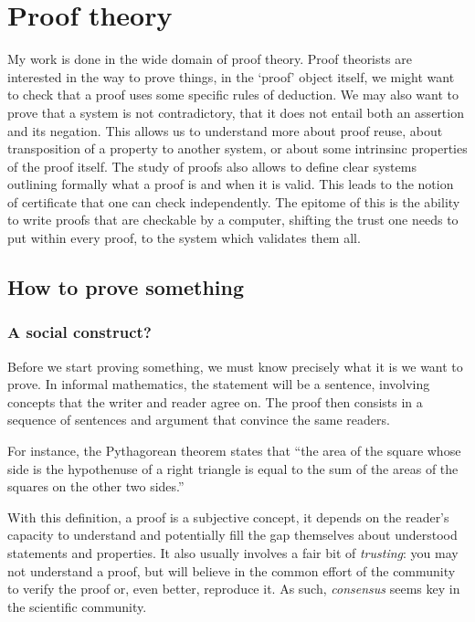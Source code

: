 \chapter{Proof theory}

My work is done in the wide domain of proof theory. Proof theorists are
interested in the way to prove things, in the `proof' object itself, \eg we
might want to check that a proof uses some specific rules of deduction.
We may also want to prove that a system is not contradictory, \ie that it does
not entail both an assertion and its negation.
This allows us to understand more about proof reuse, about transposition of a
property to another system, or about some intrinsinc properties of the proof
itself. The study of proofs also allows to define clear systems outlining
formally what a proof is and when it is valid. This leads to the notion of
certificate that one can check independently. The epitome of this is the ability
to write proofs that are checkable by a computer, shifting the trust one needs
to put within every proof, to the system which validates them all.

\section{How to prove something}

\subsection{A social construct?}

Before we start proving something, we must know precisely what it is we want to
prove. In informal mathematics, the statement will be a sentence, involving
concepts that the writer and reader agree on. The proof then consists in a
sequence of sentences and argument that convince the same readers.

For instance, the Pythagorean theorem states that
``the area of the square whose side is the hypothenuse of a right triangle is
equal to the sum of the areas of the squares on the other two sides.''

With this definition, a proof is a subjective concept, it depends on the
reader's capacity to understand and potentially fill the gap themselves about
understood statements and properties. It also usually involves a fair bit of
\emph{trusting}: you may not understand a proof, but will believe in
the common effort of the community to verify the proof or, even better,
reproduce it.
As such, \emph{consensus} seems key in the scientific community.

